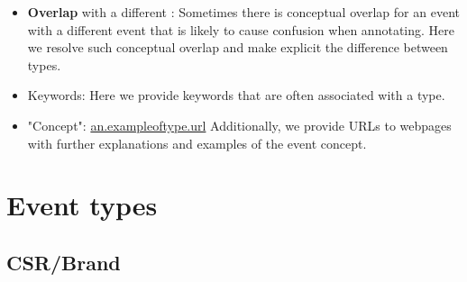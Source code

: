 \begin{itemize}[noitemsep,leftmargin=*]
	\item \textbf{Overlap} with a different : Sometimes there is conceptual overlap for an event with a different event that is likely to cause confusion when annotating. Here we resolve such conceptual overlap and make explicit the difference between types.
	\item Keywords: Here we provide keywords that are often associated with a type.
	\item "Concept": \url{an.exampleoftype.url} Additionally, we provide URLs to webpages with further explanations and examples of the event concept.
\end{itemize}
\section{Event types}

\subsection{CSR/Brand}

